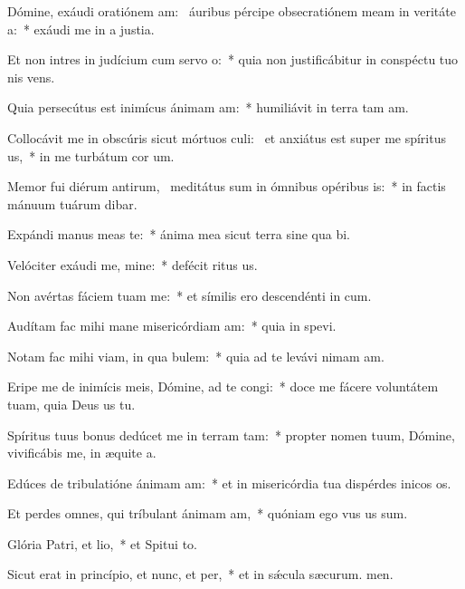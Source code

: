 \item Dómine, exáudi oratiónem am:~\pscross{} áuribus pércipe obsecratiónem meam in veritáte a:~* exáudi me in a justia.
\item Et non intres in judícium cum servo o:~* quia non justificábitur in conspéctu tuo nis vens.
\item Quia persecútus est inimícus ánimam am:~* humiliávit in terra tam am.
\item Collocávit me in obscúris sicut mórtuos culi:~\pscross{} et anxiátus est super me spíritus us,~* in me turbátum  cor um.
\item Memor fui diérum antirum,~\pscross{} meditátus sum in ómnibus opéribus is:~* in factis mánuum tuárum dibar.
\item Expándi manus meas  te:~* ánima mea sicut terra sine qua bi.
\item Velóciter exáudi me, mine:~* defécit ritus us.
\item Non avértas fáciem tuam  me:~* et símilis ero descendénti in cum.
\item Audítam fac mihi mane misericórdiam am:~* quia in  spevi.
\item Notam fac mihi viam, in qua bulem:~* quia ad te levávi nimam am.
\item Eripe me de inimícis meis, Dómine, ad te congi:~* doce me fácere voluntátem tuam, quia Deus us  tu.
\item Spíritus tuus bonus dedúcet me in terram tam:~* propter nomen tuum, Dómine, vivificábis me, in æquite a.
\item Edúces de tribulatióne ánimam am:~* et in misericórdia tua dispérdes inicos os.
\item Et perdes omnes, qui tríbulant ánimam am,~* quóniam ego vus us sum.
\item Glória Patri, et lio,~* et Spitui to.
\item Sicut erat in princípio, et nunc, et per,~* et in sǽcula sæcurum. men.
